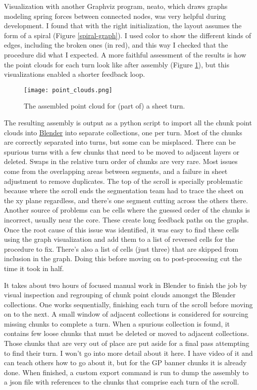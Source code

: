 \documentclass{article}
\begin{document}
Visualization with another Graphviz program, neato, which draws graphs modeling spring forces between connected nodes, was very helpful during development. I found that with the right initialization, the layout assumes the form of a spiral (Figure \ref{spiral-graph}). I used color to show the different kinds of edges, including the broken ones (in red), and this way I checked that the procedure did what I expected. A more faithful assessment of the results is how the point clouds for each turn look like after assembly (Figure \ref{Blender-point-clouds}), but this visualizations enabled a shorter feedback loop.

\begin{figure}
    \centering
    \texttt{[image: point\_clouds.png]}
    \caption{The assembled point cloud for (part of) a sheet turn.}
    \label{Blender-point-clouds}
\end{figure}

The resulting assembly is output as a python script to import all the chunk point clouds into \href{https://blender.org}{Blender} into separate collections, one per turn. Most of the chunks are correctly separated into turns, but some can be misplaced. There can be spurious turns with a few chunks that need to be moved to adjacent layers or deleted. Swaps in the relative turn order of chunks are very rare. Most issues come from the overlapping areas between segments, and a failure in sheet adjustment to remove duplicates. The top of the scroll is specially problematic because where the scroll ends the segmentation team had to trace the sheet on the xy plane regardless, and there's one segment cutting across the others there. Another source of problems can be cells where the guessed order of the chunks is incorrect, usually near the core. These create long feedback paths on the graphs. Once the root cause of this issue was identified, it was easy to find these cells using the graph visualization and add them to a list of reversed cells for the procedure to fix. There's also a list of cells (just three) that are skipped from inclusion in the graph. Doing this before moving on to post-processing cut the time it took in half.

It takes about two hours of focused manual work in Blender to finish the job by visual inspection and regrouping of chunk point clouds amongst the Blender collections. One works sequentially, finishing each turn of the scroll before moving on to the next. A small window of adjacent collections is considered for sourcing missing chunks to complete a turn. When a spurious collection is found, it contains few loose chunks that must be deleted or moved to adjacent collections. Those chunks that are very out of place are put aside for a final pass attempting to find their turn. I won't go into more detail about it here. I have video of it and can teach others how to go about it, but for the GP banner chunks it is already done. When finished, a custom export command is run to dump the assembly to a json file with references to the chunks that comprise each turn of the scroll.
\end{document}
